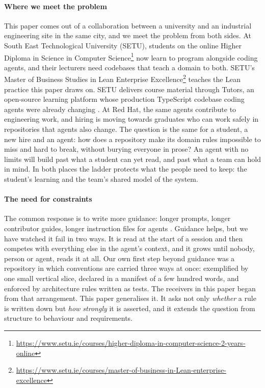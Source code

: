 \paragraph{Where we meet the problem} This paper comes out of a collaboration between a
university and an industrial engineering site in the same city, and we meet the problem from
both sides. At South East Technological University (SETU), students on the online Higher
Diploma in Science in Computer Science\footnote{\url{https://www.setu.ie/courses/higher-diploma-in-computer-science-2-years-online}} now learn to
program alongside coding agents, and their lecturers need codebases that teach a domain to both.
SETU's Master of Business Studies in Lean Enterprise
Excellence\footnote{\url{https://www.setu.ie/courses/master-of-business-in-Lean-enterprise-excellence}} teaches the Lean practice this
paper draws on. SETU delivers course material through Tutors, an open-source learning
platform whose production TypeScript codebase coding agents were already changing
\citep{tutorsmonorepo}. At Red Hat, the same agents contribute to engineering work, and hiring
is moving towards graduates who can work safely in repositories that agents also change. The
question is the same for a student, a new hire and an agent: how does a repository make its
domain rules impossible to miss and hard to break, without burying everyone in prose? An agent
with no limits will build past what a student can yet read, and past what a team can hold in
mind. In both places the ladder protects what the people need to keep: the student's learning
and the team's shared model of the system.

\paragraph{The need for constraints} The common response is to write more guidance: longer
prompts, longer contributor guides, longer instruction files for agents
\citep{agentsmd}. Guidance helps, but we have watched it fail in two ways. It is read at the
start of a session and then competes with everything else in the agent's context, and it grows
until nobody, person or agent, reads it at all. Our own first step beyond guidance was a
repository in which conventions are carried three ways at once: exemplified by one small
vertical slice, declared in a manifest of a few hundred words, and enforced by architecture
rules written as tests. The receivers in this paper began from that arrangement. This paper
generalises it. It asks not only \emph{whether} a rule is written down but \emph{how strongly}
it is asserted, and it extends the question from structure to behaviour and requirements.

